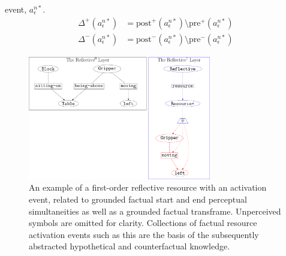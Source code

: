 event, $a^{n*}_\epsilon$.
\begin{align}
\label{equation:define_delta_first}
       \Delta^{+}(a^{n*}_\epsilon) &= \text{post}^{+}(a^{n*}_\epsilon) \setminus \text{pre}^{+}(a^{n*}_\epsilon) \\
\label{equation:define_delta_last}
       \Delta^{-}(a^{n*}_\epsilon) &= \text{post}^{-}(a^{n*}_\epsilon) \setminus \text{pre}^{-}(a^{n*}_\epsilon)
\end{align}
\begin{figure}
\center
\includegraphics[width=8cm]{gfx/example_resource}
\caption[An example of a first-order reflective resource with an
  activation event.]{An example of a first-order reflective resource
  with an activation event, related to grounded factual start and end
  perceptual simultaneities as well as a grounded factual transframe.
  Unperceived symbols are omitted for clarity.  Collections of factual
  resource activation events such as this are the basis of the
  subsequently abstracted hypothetical and counterfactual knowledge.}
\label{figure:example_resource}
\end{figure}

